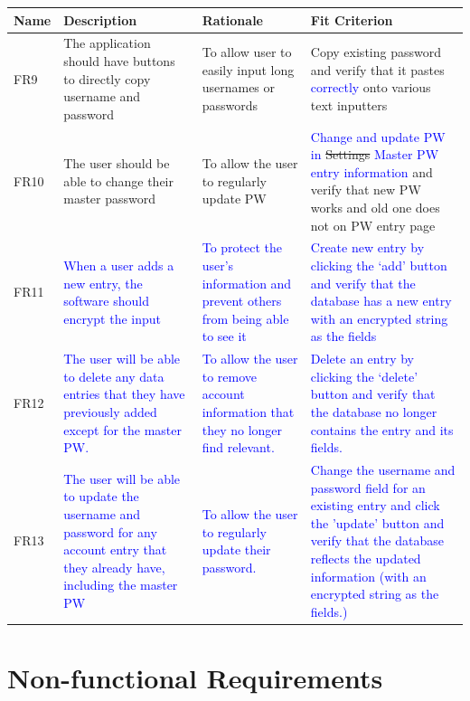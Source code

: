 \documentclass[12pt, titlepage]{article}
\begin{document}
\begin{table}[H]
\centering
\small
\begin{tabular}{ | p{1cm} | p{4cm} | p{4cm} | p{4cm} | }
	\hline
	Name & Description & Rationale & Fit Criterion\\
	\hline
	FR9 & The application should have buttons to directly copy username and password & To allow user to easily input long usernames or passwords & Copy existing password and verify that it pastes \textcolor{blue}{correctly} onto various text inputters \\
	\hline
	FR10 & The user should be able to change their master password & To allow the user to regularly update PW & \textcolor{blue}{Change and update PW in} \sout{Settings} \textcolor{blue}{Master PW entry information} and verify that new PW works and old one does not on PW entry page\\
	\hline
	FR11 & \textcolor{blue}{When a user adds a new entry, the software should encrypt the input} & \textcolor{blue}{To protect the user’s information and prevent others from being able to see it} & \textcolor{blue}{Create new entry by clicking the ‘add’ button and verify that the database has a new entry with an encrypted string as the fields} \\
	\hline
	FR12 & \textcolor{blue}{The user will be able to delete any data entries that they have previously added except for the master PW.} & \textcolor{blue}{To allow the user to remove account information that they no longer find relevant.} & \textcolor{blue}{Delete an entry by clicking the ‘delete’ button and verify that the database no longer contains the entry and its fields.} \\
	\hline
	FR13 & \textcolor{blue}{The user will be able to update the username and password for any account entry that they already have, including the master PW} & \textcolor{blue}{To allow the user to regularly update their password.} & \textcolor{blue}{Change the username and password field for an existing entry and click the 'update' button and verify that the database reflects the updated information (with an encrypted string as the fields.)} \\
\hline
\end{tabular}
\end{table}

\section{Non-functional Requirements}
\end{document}
